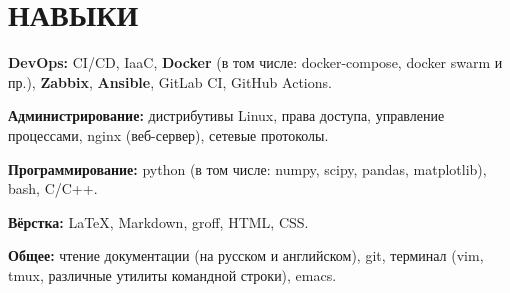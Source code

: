 \section{НАВЫКИ}

\begin{description}

  \setlength\itemsep{-0.4em}

\item{\bfseries DevOps:} CI/CD, IaaC, \textbf{Docker} (в том числе:
  docker-compose, docker swarm и пр.), \textbf{Zabbix},
  \textbf{Ansible}, GitLab CI, GitHub Actions.
  
\item{\bfseries Администрирование:} дистрибутивы Linux, права доступа,
  управление процессами, nginx (веб-сервер), сетевые протоколы.
    
\item{\bfseries Программирование:} python (в том числе: numpy, scipy,
pandas, matplotlib), bash, C/C++.
    
\item{\bfseries Вёрстка:} \LaTeX, Markdown, groff, HTML, CSS.

\item{\bfseries Общее:} чтение документации (на русском и английском),
  git, терминал (vim, tmux, различные утилиты командной строки), emacs.

\end{description}
    
\vspace{.7em}
